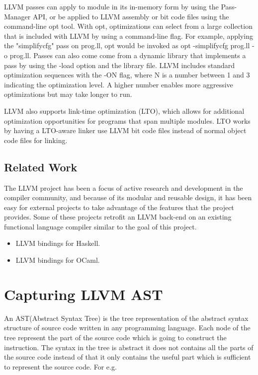 \documentclass[openany]{book}
\begin{document}
	 LLVM passes can apply to module in its in-memory form by using the Pass-Manager API, or be applied to LLVM assembly or bit code files using the command-line opt tool. With opt, optimizations can select from a large collection that is included with LLVM by using a command-line flag.  For example, applying the "simplifycfg" pass on prog.ll, opt would be invoked as opt -simplifycfg prog.ll -o prog.ll. Passes can also come come from a dynamic library that implements a pass by using the -load option and the library file. LLVM includes standard optimization sequences with the -ON flag, where N is a number between 1 and 3 indicating the optimization level. A higher number enables more aggressive optimizations but may take longer to run.\newline \newline
	 
	 LLVM also supports link-time optimization (LTO),  which allows for additional optimization opportunities for programs that span multiple modules. LTO works by having a LTO-aware linker use LLVM bit code files instead of normal object code files for linking.
	 
	\section{Related Work}
	The LLVM project has been a focus of active research and development in the compiler	community, and because of its modular and reusable design, it has been easy for external
	projects to take advantage of the features that the project provides. Some of these projects retrofit an LLVM back-end on an existing functional language compiler similar to the goal
	of this project.
	
	\begin{itemize}
		\item LLVM bindings for Haskell.
		\item LLVM bindings for OCaml.
	\end{itemize}

\chapter{Capturing LLVM AST }
An AST(Abstract Syntax Tree) is the tree representation of the abstract syntax structure of source code written in any programming language. Each node of the tree represent the part of the source code which is going to construct the instruction. The syntax in the tree is abstract it does not contains all the parts of the source code instead of that it only contains the useful part which is sufficient to represent the source code. For e.g.\newline
\end{document}
